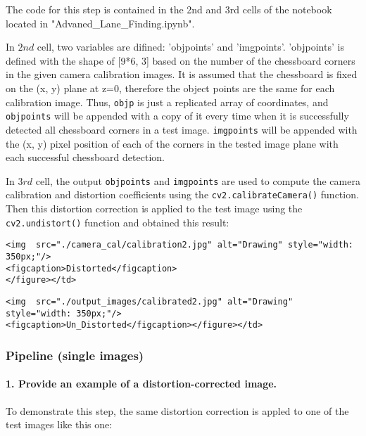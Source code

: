 \documentclass[11pt]{article}
\begin{document}
The code for this step is contained in the 2nd and 3rd cells of the
notebook located in "Advaned\_Lane\_Finding.ipynb".

In \(2nd\) cell, two variables are difined: 'objpoints' and 'imgpoints'.
'objpoints' is defined with the shape of {[}9*6, 3{]} based on the
number of the chessboard corners in the given camera calibration images.
It is assumed that the chessboard is fixed on the (x, y) plane at z=0,
therefore the object points are the same for each calibration image.
Thus, \texttt{objp} is just a replicated array of coordinates, and
\texttt{objpoints} will be appended with a copy of it every time when it
is successfully detected all chessboard corners in a test image.
\texttt{imgpoints} will be appended with the (x, y) pixel position of
each of the corners in the tested image plane with each successful
chessboard detection.

In \(3rd\) cell, the output \texttt{objpoints} and \texttt{imgpoints}
are used to compute the camera calibration and distortion coefficients
using the \texttt{cv2.calibrateCamera()} function. Then this distortion
correction is applied to the test image using the
\texttt{cv2.undistort()} function and obtained this result:

\begin{verbatim}
<img  src="./camera_cal/calibration2.jpg" alt="Drawing" style="width: 350px;"/>
<figcaption>Distorted</figcaption>
</figure></td>
\end{verbatim}

\begin{verbatim}
<img  src="./output_images/calibrated2.jpg" alt="Drawing" style="width: 350px;"/>
<figcaption>Un_Distorted</figcaption></figure></td>
\end{verbatim}

\subsubsection{Pipeline (single images)}\label{pipeline-single-images}

\paragraph{1. Provide an example of a distortion-corrected
image.}\label{provide-an-example-of-a-distortion-corrected-image.}

To demonstrate this step, the same distortion correction is appled to
one of the test images like this one:
\end{document}

